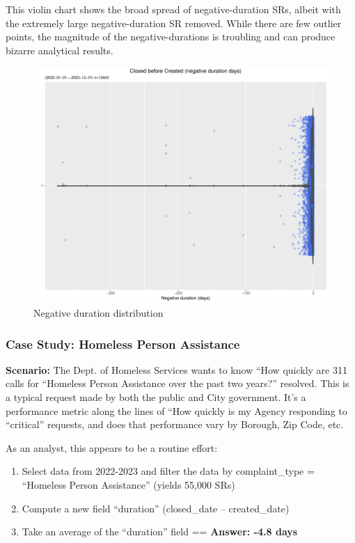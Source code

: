 \documentclass[12pt, titlepage]{article}
\begin{document}
{This violin chart shows the broad spread of negative-duration SRs, albeit with the extremely large 
negative-duration SR removed. While there are few outlier points, the magnitude of the negative-durations
is troubling and can produce bizarre analytical results.

\begin{figure}[H]
 	 \centering
	  \includegraphics[width = \textwidth]{negative_duration_SR_violin.pdf}
	  \caption{Negative duration distribution}
	  \label{fig:negative-duration-violin}
\end{figure}


\subsubsection{Case Study: Homeless Person Assistance}
		\textbf{Scenario:} The Dept. of Homeless Services wants to know ``How quickly are 311 calls for ``Homeless Person
		Assistance over the past two years?'' resolved. This is a typical request made by both the public and City government. It's a performance metric along the lines
		of ``How quickly is my Agency responding to ``critical'' requests, and does that performance vary by Borough, Zip Code, etc. 

		As an analyst, this appears to be a routine effort: 
		
		\begin{enumerate}
		    \item Select data from 2022-2023 and filter the data by complaint\_type = ``Homeless Person Assistance'' (yields 55,000 SRs)
		    \item Compute a new field ``duration'' (closed\_date – created\_date)
		    \item Take an average of the ``duration'' field == \textbf{Answer:  -4.8 days}  
		\end{enumerate}
		
}
\end{document}
